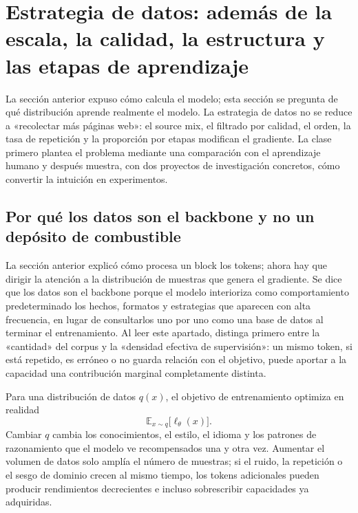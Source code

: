 \section{Estrategia de datos: además de la escala, la calidad, la estructura y las etapas de aprendizaje}

La sección anterior expuso cómo calcula el modelo; esta sección se pregunta de qué distribución aprende realmente el modelo. La estrategia de datos no se reduce a «recolectar más páginas web»: el source mix, el filtrado por calidad, el orden, la tasa de repetición y la proporción por etapas modifican el gradiente. La clase primero plantea el problema mediante una comparación con el aprendizaje humano y después muestra, con dos proyectos de investigación concretos, cómo convertir la intuición en experimentos.

\subsection{Por qué los datos son el backbone y no un depósito de combustible}

La sección anterior explicó cómo procesa un block los tokens; ahora hay que dirigir la atención a la distribución de muestras que genera el gradiente. Se dice que los datos son el backbone porque el modelo interioriza como comportamiento predeterminado los hechos, formatos y estrategias que aparecen con alta frecuencia, en lugar de consultarlos uno por uno como una base de datos al terminar el entrenamiento. Al leer este apartado, distinga primero entre la «cantidad» del corpus y la «densidad efectiva de supervisión»: un mismo token, si está repetido, es erróneo o no guarda relación con el objetivo, puede aportar a la capacidad una contribución marginal completamente distinta.

Para una distribución de datos $q(x)$, el objetivo de entrenamiento optimiza en realidad
\[
\mathbb{E}_{x\sim q}\big[\ell_{\theta}(x)\big].
\]
Cambiar $q$ cambia los conocimientos, el estilo, el idioma y los patrones de razonamiento que el modelo ve recompensados una y otra vez. Aumentar el volumen de datos solo amplía el número de muestras; si el ruido, la repetición o el sesgo de dominio crecen al mismo tiempo, los tokens adicionales pueden producir rendimientos decrecientes e incluso sobrescribir capacidades ya adquiridas.




